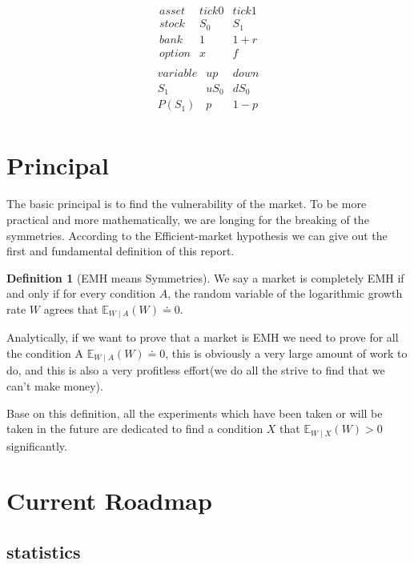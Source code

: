 \documentclass{article}
\theoremstyle{definition} %
\newtheorem{definition}{Definition}[section]
\begin{document}
$$
    \begin{array}{c|ccc}
        asset  & tick0 & tick1 \\
        stock  & S_0   & S_1   \\
        \hline
        bank   & 1     & 1+r   \\
        \hline
        option & x     & f     \\
    \end{array}
$$
$$
    \begin{array}{c|ccc}
        variable & up   & down \\
        S_1      & uS_0 & dS_0 \\
        \hline
        P(S_1)   & p    & 1-p  \\
    \end{array}
$$


\section{Principal}
The basic principal is to find the vulnerability
of the market. To be more practical and more
mathematically, we are longing for the breaking
of the symmetries. According to the
Efficient-market hypothesis\cite[Hypothesis]{EMH}
we can give out the first and fundamental
definition of this report.

\begin{definition}[EMH means Symmetries]
    \label{def:mydefinition}
    We say a market is completely EMH if and
    only if for every condition $A$, the random
    variable of the logarithmic growth rate $W$
    agrees that $\mathbb{E}_{W\mid A}(W)\doteq 0$.
\end{definition}

Analytically, if we want to prove that a market is
EMH we need to prove for all the condition A
$\mathbb{E}_{W\mid A}(W)\doteq 0$, this is
obviously a very large amount of work to do, and
this is also a very profitless effort(we do all
the strive to find that we can't make money).

Base on this definition, all the experiments which
have been taken or will be taken in the future
are dedicated to find a condition $X$ that
$\mathbb{E}_{W\mid X}(W)>0$ significantly.

\section{Current Roadmap}
\subsection{statistics}
\end{document}
